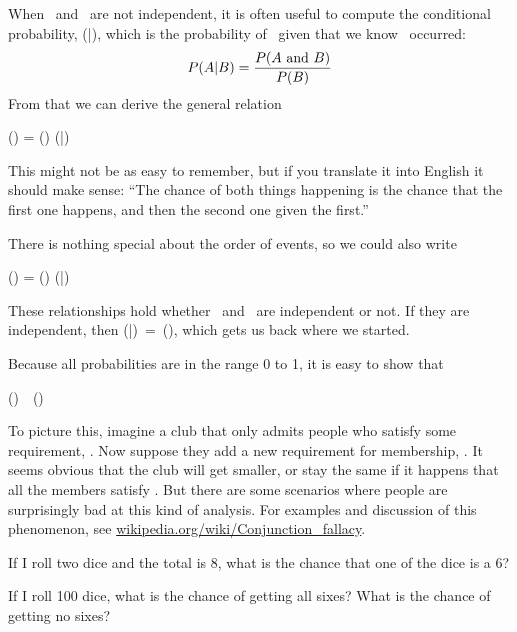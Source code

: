 \documentclass[12pt]{book}
\begin{document}
When \A~and \B~are not independent, it is often useful to compute
the conditional probability, \Prob(\A|\B), which is the probability of
\A~given that we know \B~occurred:
%
\[ P(A|B) = \frac{P(A ~\mbox{and}~ B)}{P(B)} \]
%
From that we can derive the general relation

\quad \Prob(\A \AND \B) = \Prob(\A) \Prob(\B|\A)

This might not be as easy to remember, but if you translate it into
English it should make sense: ``The chance of both things happening
is the chance that the first one happens, and then the second one
given the first.''

There is nothing special about the order of events, so we could also
write

\quad \Prob(\A \AND \B) = \Prob(\B) \Prob(\A|\B)

These relationships hold whether \A~and \B~are independent or not.
If they are independent, then \Prob(\A|\B)~=~\Prob(\A), which gets us back
where we started.

Because all probabilities are in the range 0 to 1, it is
easy to show that 

\quad \Prob(\A \AND \B)~\myle~\Prob(\A)

To picture this, imagine a club that only admits people who satisfy
some requirement, \A.  Now suppose they add a new requirement for
membership, \B.  It seems obvious that the club will get smaller, or
stay the same if it happens that all the members satisfy \B.  But
there are some scenarios where people are surprisingly bad at this
kind of analysis.  For examples and discussion of this phenomenon, see
\url{wikipedia.org/wiki/Conjunction_fallacy}.

\begin{exercise}
If I roll two dice and the total is 8, what is the chance that
one of the dice is a 6?

\end{exercise}

\begin{exercise}
If I roll 100 dice, what is the chance of getting all sixes?
What is the chance of getting no sixes?

\end{exercise}
\end{document}
